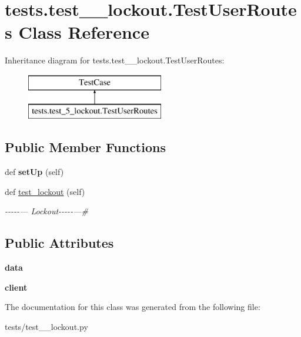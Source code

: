 \hypertarget{classtests_1_1test__5__lockout_1_1_test_user_routes}{}\section{tests.\+test\+\_\+\_\+lockout.\+Test\+User\+Routes Class Reference}
\label{classtests_1_1test__5__lockout_1_1_test_user_routes}
Inheritance diagram for tests.\+test\+\_\+\_\+lockout.\+Test\+User\+Routes\+:\begin{figure}[H]
\begin{center}
\leavevmode
\includegraphics[height=2.000000cm]{classtests_1_1test__5__lockout_1_1_test_user_routes}
\end{center}
\end{figure}
\subsection*{Public Member Functions}
\begin{DoxyCompactItemize}
\item 
\mbox{\label{classtests_1_1test__5__lockout_1_1_test_user_routes_ac18f95845c9e673845f539fc9ff195a5}} 
def {\bfseries set\+Up} (self)
\item 
\mbox{\label{classtests_1_1test__5__lockout_1_1_test_user_routes_a521a36455254123faf4a39c0409b4047}} 
def \hyperlink{classtests_1_1test__5__lockout_1_1_test_user_routes_a521a36455254123faf4a39c0409b4047}{test\+\_\+lockout} (self)
\begin{DoxyCompactList}\small\item\em -\/-\/-\/-\/-\/--- Lockout-\/-\/-\/-\/-\/---\# \end{DoxyCompactList}\end{DoxyCompactItemize}
\subsection*{Public Attributes}
\begin{DoxyCompactItemize}
\item 
\mbox{\label{classtests_1_1test__5__lockout_1_1_test_user_routes_af6c3dc409b15633601a67a8305c0a17d}} 
{\bfseries data}
\item 
\mbox{\label{classtests_1_1test__5__lockout_1_1_test_user_routes_aabc485010a3b51f5329bbb5fc5f94608}} 
{\bfseries client}
\end{DoxyCompactItemize}


The documentation for this class was generated from the following file\+:\begin{DoxyCompactItemize}
\item 
tests/test\+\_\+\_\+lockout.\+py\end{DoxyCompactItemize}

